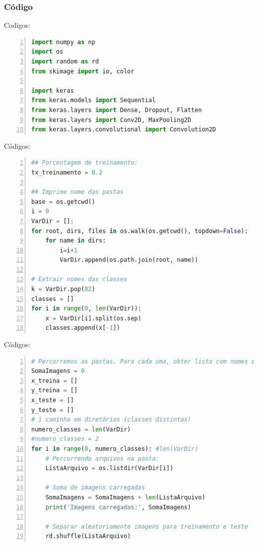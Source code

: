 \documentclass[hyperref={pdfpagelabels=false},table]{beamer}
\begin{document}
\begin{frame}[containsverbatim]
	\frametitle{Código}
	\begin{exampleblock}{Codigos:}
		\begin{lstlisting}[language=python, showspaces=false, breaklines=true,
		keepspaces=true, numbers=left, numberfirstline=false]
import numpy as np
import os
import random as rd
from skimage import io, color

import keras
from keras.models import Sequential
from keras.layers import Dense, Dropout, Flatten
from keras.layers import Conv2D, MaxPooling2D
from keras.layers.convolutional import Convolution2D
		\end{lstlisting}
	\end{exampleblock}
\end{frame}

\begin{frame}[containsverbatim]
	\begin{exampleblock}{Códigos:}
		\begin{lstlisting}[language=python, showspaces=false, breaklines=true,
		keepspaces=true, numbers=left, numberfirstline=false]
## Porcentagem de treinamento:
tx_treinamento = 0.2

## Imprime nome das pastas
base = os.getcwd()
i = 0
VarDir = [];
for root, dirs, files in os.walk(os.getcwd(), topdown=False):
    for name in dirs:
        i=i+1
        VarDir.append(os.path.join(root, name))

# Extrair nomes das classes
k = VarDir.pop(82)
classes = []
for i in range(0, len(VarDir)):
    x = VarDir[i].split(os.sep)
    classes.append(x[-1])		
		\end{lstlisting}
	\end{exampleblock}
\end{frame}

\begin{frame}[containsverbatim]
	\begin{exampleblock}{Códigos:}
		\begin{lstlisting}[language=python, showspaces=false, breaklines=true,
		keepspaces=true, numbers=left, numberfirstline=false]
# Percorremos as pastas. Para cada uma, obter lista com nomes das imagens
SomaImagens = 0
x_treina = []
y_treina = []
x_teste = []
y_teste = []
# i caminha em diretórios (classes distintas)
numero_classes = len(VarDir)
#numero_classes = 2
for i in range(0, numero_classes): #len(VarDir)
    # Percorrendo arquivos na pasta:
    ListaArquivo = os.listdir(VarDir[i])
    
    # Soma de imagens carregadas
    SomaImagens = SomaImagens + len(ListaArquivo)
    print('Imagens carregadas:', SomaImagens)
    
    # Separar aleatoriamente imagens para treinamento e teste
    rd.shuffle(ListaArquivo)
		\end{lstlisting}
	\end{exampleblock}
\end{frame}
\end{document}
